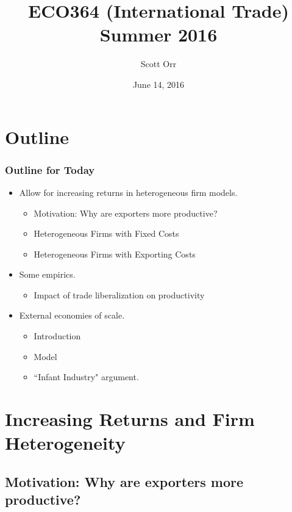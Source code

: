 \documentclass{beamer}
\title{ECO364 (International Trade) Summer 2016}
\date{June 14, 2016}
\author[Scott Orr]{Scott Orr}
\institute{University of Toronto}
\begin{document}
	
	\begin{frame}
		\titlepage
	\end{frame}
	
	\section{Outline}
	
\begin{frame}
	\frametitle{Outline for Today}
	
		\begin{itemize}
			\item Allow for increasing returns in heterogeneous firm models.
			\begin{itemize}
				\item Motivation: Why are exporters more productive?
				\item Heterogeneous Firms with Fixed Costs
				\item Heterogeneous Firms with Exporting Costs
			\end{itemize}
			\item Some empirics.
				\begin{itemize}
					\item Impact of trade liberalization on productivity
				\end{itemize}
			\item External economies of scale.
				\begin{itemize}
					\item Introduction
					\item Model
					\item ``Infant Industry" argument.
				\end{itemize}
		\end{itemize}

\end{frame}

\section{Increasing Returns and Firm Heterogeneity}
\subsection{Motivation: Why are exporters more productive?}
\end{document}
